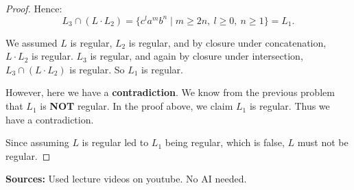 \documentclass{article}
\theoremstyle{definition}
\newenvironment {solution}
{
\begin{tcolorbox}
}
{
\end{tcolorbox}
}
\begin{document}
\begin{enumerate}
\begin{solution}
\begin{proof}
                  Hence:
                  $$L_3 \cap (L \cdot L_2) = \{c^l a^m b^n \mid m \geq 2n,\ l \geq 0,\ n \geq 1\} = L_1.$$

                  We assumed $L$ is regular, $L_2$ is regular, and by closure under
                  concatenation, $L \cdot L_2$ is regular. $L_3$ is regular, and again by
                  closure under intersection, $L_3 \cap (L \cdot L_2)$ is regular. So $L_1$
                  is regular.

                  However, here we have a \textbf{contradiction}. We know from the previous
                  problem that $L_1$ is \textbf{NOT} regular. In the proof above, we claim
                  $L_1$ is regular. Thus we have a contradiction.

                  Since assuming $L$ is regular led to $L_1$ being regular, which is false,
                  $L$ must not be regular.
              \end{proof}

              \textbf{Sources:} Used lecture videos on youtube. No AI needed.
          \end{solution}
\end{enumerate}
\end{document}
